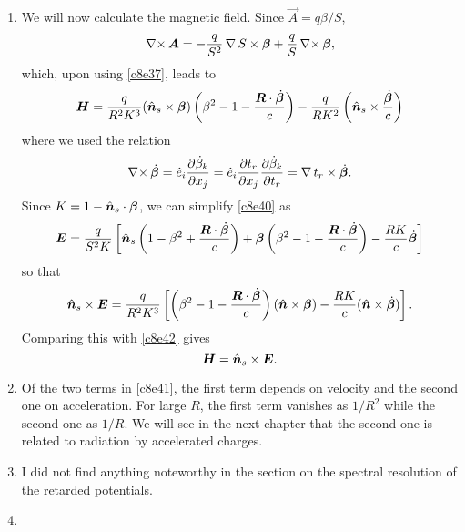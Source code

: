 \begin{enumerate}
\item We will now calculate the magnetic field. Since $\vec{A} = q\beta/S$,
\[
\operatorname{\nabla\times}\bm{A} = -\frac{q}{S^2}\operatorname{\nabla} S \times \bm{\beta} + 
\frac{q}{S}\operatorname{\nabla\times}\bm{\beta},
\]
which, upon using \eqref{c8e37}, leads to
\begin{equation}\label{c8e42}
\bm{H} = \frac{q}{R^2K^3}(\hat{\bm{n}}_s\times\bm{\beta})
\left(\beta^2 - 1 - \frac{\bm{R}\cdot\dot{\bm{\beta}}}{c}\right) -
\frac{q}{RK^2}\left(\hat{\bm{n}}_s \times \frac{\dot{\bm{\beta}}}{c}\right)
\end{equation}
where we used the relation
\[
\operatorname{\nabla\times}\dot{\bm{\beta}} = \hat{e}_i\frac{\partial{\dot{\beta}_k}}{\partial{x_j}} =
\hat{e}_i\frac{\partial{t_r}}{\partial{x_j}}\frac{\partial{\dot{\beta}_k}}{\partial{t_r}} = 
\operatorname{\nabla}{t_r}\times\dot{\bm{\beta}}.
\]
Since $K = 1 - \hat{\bm{n}}_s\cdot\bm{\beta}$, we can simplify \eqref{c8e40} as
\[
\bm{E} = \frac{q}{S^2K}\left[
\hat{\bm{n}}_s\left(1 - \beta^2 + \frac{\bm{R}\cdot\dot{\bm{\beta}}}{c}\right) +
\bm{\beta}\left(\beta^2 - 1 - \frac{\bm{R}\cdot\dot{\bm{\beta}}}{c}\right)- 
\frac{RK}{c}\dot{\bm{\beta}}\right]
\]
so that
\[
\hat{\bm{n}}_s \times \bm{E} = \frac{q}{R^2K^3}\left[
\left(\beta^2 - 1 - \frac{\bm{R}\cdot\dot{\bm{\beta}}}{c}\right)
(\hat{\bm{n}}\times\bm{\beta}) - \frac{RK}{c}(\hat{\bm{n}}\times\dot{\bm{\beta}})\right].
\]
Comparing this with \eqref{c8e42} gives
\begin{equation}\label{c8e43}
\bm{H} = \hat{\bm{n}}_s \times \bm{E}.
\end{equation}

\item Of the two terms in \eqref{c8e41}, the first term depends on velocity
and the second one on acceleration. For large $R$, the first term vanishes as
$1/R^2$ while the second one as $1/R$. We will see in the next chapter that the
second one is related to radiation by accelerated charges. 

\item I did not find anything noteworthy in the section on the spectral
resolution of the retarded potentials.

\item
\end{enumerate}
